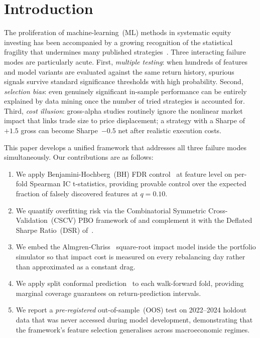 \documentclass[journal]{IEEEtran}
\begin{document}
\section{Introduction}
\label{sec:intro}

The proliferation of machine-learning~(ML) methods in systematic
equity investing has been accompanied by a growing recognition of
the statistical fragility that undermines many published
strategies~\cite{harvey2016and, lopez2018advances}.
Three interacting failure modes are particularly acute.
First, \emph{multiple testing}: when hundreds of features and model
variants are evaluated against the same return history, spurious
signals survive standard significance thresholds with high
probability.
Second, \emph{selection bias}: even genuinely significant in-sample
performance can be entirely explained by data mining once the number
of tried strategies is accounted for.
Third, \emph{cost illusion}: gross-alpha studies routinely ignore
the nonlinear market impact that links trade size to price
displacement; a strategy with a Sharpe of~$+1.5$ gross can become
Sharpe~$-0.5$ net after realistic execution costs.

This paper develops a unified framework that addresses all three
failure modes simultaneously. Our contributions are as follows:

\begin{enumerate}
  \item We apply Benjamini-Hochberg~(BH) FDR control~\cite{bh1995} at
        feature level on per-fold Spearman IC t-statistics, providing
        provable control over the expected fraction of falsely
        discovered features at $q=0.10$.

  \item We quantify overfitting risk via the Combinatorial Symmetric
        Cross-Validation~(CSCV) PBO framework of
        \citet{bailey2015probability} and complement it with the
        Deflated Sharpe Ratio~(DSR) of~\citet{bailey2014deflated}.

  \item We embed the Almgren-Chriss~\cite{almgren2001optimal}
        square-root impact model inside the portfolio simulator so
        that impact cost is measured on every rebalancing day rather
        than approximated as a constant drag.

  \item We apply split conformal prediction~\cite{vovk2005algorithmic,
        angelopoulos2021gentle} to each walk-forward fold, providing
        marginal coverage guarantees on return-prediction intervals.

  \item We report a \emph{pre-registered} out-of-sample~(OOS) test on
        2022--2024 holdout data that was never accessed during model
        development, demonstrating that the framework's feature
        selection generalises across macroeconomic regimes.
\end{enumerate}
\end{document}
